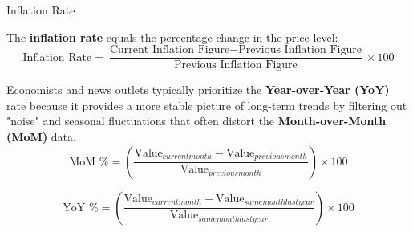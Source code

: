 \documentclass[10pt]{article}
\begin{document}
    \begin{core}{Inflation Rate}

      The \textbf{inflation rate} equals the percentage change in the price level:
      \[
        \text{Inflation Rate} = \frac{\text{Current Inflation Figure} - \text{Previous Inflation Figure}}{\text{Previous Inflation Figure}} \times 100
      \]

      Economists and news outlets typically prioritize the \textbf{Year-over-Year (YoY)} rate because it provides a more stable picture of long-term trends by filtering out "noise" and seasonal fluctuations that often distort the \textbf{Month-over-Month (MoM)} data.
      \[
        \text{MoM \%} = \left( \frac{\text{Value}_{current month} - \text{Value}_{previous month}}{\text{Value}_{previous month}} \right) \times 100
      \]

      \[
        \text{YoY \%} = \left( \frac{\text{Value}_{current month} - \text{Value}_{same month last year}}{\text{Value}_{same month last year}} \right) \times 100
      \]

    \end{core}
\end{document}
